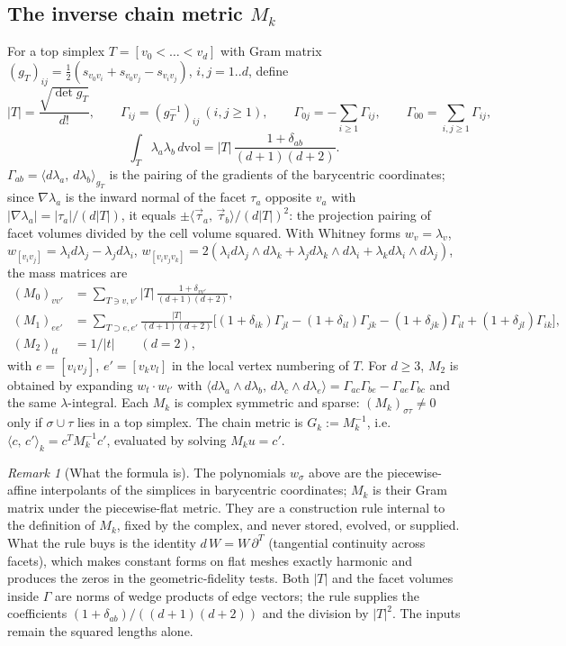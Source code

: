 \documentclass[11pt]{article}
\theoremstyle{definition}
\theoremstyle{plain}
\theoremstyle{remark}
\newtheorem{remark}{Remark}[section]
\newcommand{\Gram}{g}
\newcommand{\bd}{\partial}
\newcommand{\blade}[1]{\vec{#1}}
\newcommand{\ip}[2]{\langle #1,\, #2\rangle}
\newcommand{\Tr}{^{T}}
\begin{document}
\subsection{The inverse chain metric \(M_k\)}
For a top simplex \(T=[v_0<\dots<v_d]\) with Gram matrix \((\Gram_T)_{ij}=\tfrac12(s_{v_0v_i}+s_{v_0v_j}-s_{v_iv_j})\), \(i,j=1..d\), define
\[
|T|=\frac{\sqrt{\det\Gram_T}}{d!},\qquad
\Gamma_{ij}=(\Gram_T^{-1})_{ij}\ (i,j\ge1),\qquad \Gamma_{0j}=-\sum_{i\ge1}\Gamma_{ij},\qquad \Gamma_{00}=\sum_{i,j\ge1}\Gamma_{ij},
\]
\[
\int_T\lambda_a\lambda_b\,d\mathrm{vol}=|T|\,\frac{1+\delta_{ab}}{(d+1)(d+2)} .
\]
\(\Gamma_{ab}=\ip{d\lambda_a}{d\lambda_b}_{\Gram_T}\) is the pairing of the gradients of the barycentric coordinates; since \(\nabla\lambda_a\) is the inward normal of the facet \(\tau_a\) opposite \(v_a\) with \(|\nabla\lambda_a|=|\tau_a|/(d|T|)\), it equals \(\pm\ip{\blade\tau_a}{\blade\tau_b}/(d|T|)^{2}\): the projection pairing of facet volumes divided by the cell volume squared. With Whitney forms \(w_v=\lambda_v\), \(w_{[v_iv_j]}=\lambda_id\lambda_j-\lambda_jd\lambda_i\), \(w_{[v_iv_jv_k]}=2(\lambda_id\lambda_j\wedge d\lambda_k+\lambda_jd\lambda_k\wedge d\lambda_i+\lambda_kd\lambda_i\wedge d\lambda_j)\), the mass matrices are
\begin{align*}
(M_0)_{vv'}&=\sum_{T\ni v,v'}|T|\,\frac{1+\delta_{vv'}}{(d+1)(d+2)},\\
(M_1)_{ee'}&=\sum_{T\supset e,e'}\frac{|T|}{(d+1)(d+2)}\Big[(1+\delta_{ik})\Gamma_{jl}-(1+\delta_{il})\Gamma_{jk}-(1+\delta_{jk})\Gamma_{il}+(1+\delta_{jl})\Gamma_{ik}\Big],\\
(M_2)_{tt}&=1/|t|\qquad(d=2),
\end{align*}
with \(e=[v_iv_j]\), \(e'=[v_kv_l]\) in the local vertex numbering of \(T\). For \(d\ge3\), \(M_2\) is obtained by expanding \(w_t\cdot w_{t'}\) with \(\ip{d\lambda_a\wedge d\lambda_b}{d\lambda_c\wedge d\lambda_e}=\Gamma_{ac}\Gamma_{be}-\Gamma_{ae}\Gamma_{bc}\) and the same \(\lambda\)-integral. Each \(M_k\) is complex symmetric and sparse: \((M_k)_{\sigma\tau}\neq0\) only if \(\sigma\cup\tau\) lies in a top simplex. The chain metric is \(G_k:=M_k^{-1}\), i.e.\ \(\ip{c}{c'}_k=c\Tr M_k^{-1}c'\), evaluated by solving \(M_ku=c'\).

\begin{remark}[What the formula is]
The polynomials \(w_\sigma\) above are the piecewise-affine interpolants of the simplices in barycentric coordinates; \(M_k\) is their Gram matrix under the piecewise-flat metric. They are a construction rule internal to the definition of \(M_k\), fixed by the complex, and never stored, evolved, or supplied. What the rule buys is the identity \(d\,W=W\,\bd\Tr\) (tangential continuity across facets), which makes constant forms on flat meshes exactly harmonic and produces the zeros in the geometric-fidelity tests. Both \(|T|\) and the facet volumes inside \(\Gamma\) are norms of wedge products of edge vectors; the rule supplies the coefficients \((1+\delta_{ab})/((d+1)(d+2))\) and the division by \(|T|^{2}\). The inputs remain the squared lengths alone.
\end{remark}
\end{document}
